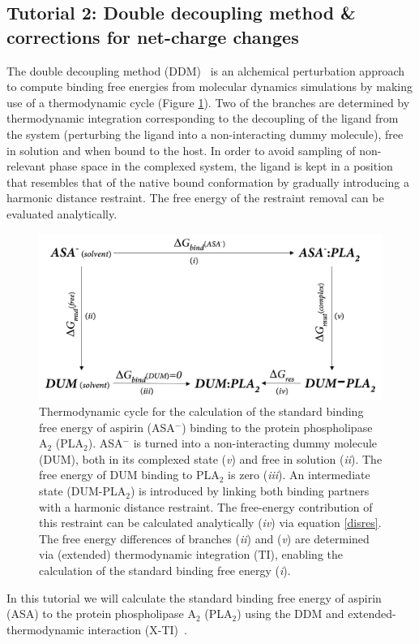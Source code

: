 
\subsection{Tutorial 2: Double decoupling method \& corrections for net-charge changes}
The double decoupling method (DDM)~\cite{DDM} is an alchemical perturbation approach to compute binding free energies from molecular dynamics simulations by making use of a thermodynamic cycle (Figure \ref{TC_ASA}). Two of the branches are determined by thermodynamic integration corresponding to the decoupling of the ligand from the system (perturbing the ligand into a non-interacting dummy molecule), free in solution and when bound to the host. In order to avoid sampling of non-relevant phase space in the complexed system, the ligand is kept in a position that resembles that of the native bound conformation by gradually introducing a harmonic distance restraint. The free energy of the restraint removal can be evaluated analytically.

\begin{figure}[H]
    \centering
    \includegraphics[scale=0.21]{../05_tutorial_02/figures/TC_ASA.png}
    \caption{Thermodynamic cycle for the calculation of the standard binding free energy of aspirin (ASA$^-$) binding to the protein phospholipase A$_2$ (PLA$_2$). ASA$^-$ is turned into a non-interacting dummy molecule (DUM), both in its complexed state (\textit{v}) and free in solution (\textit{ii}). The free energy of DUM binding to PLA$_2$ is zero (\textit{iii}). An intermediate state (DUM-PLA$_2$) is introduced by linking both binding partners with a harmonic distance restraint. The free-energy contribution of this restraint can be calculated analytically (\textit{iv}) via equation \ref{disres}. The free energy differences of branches (\textit{ii}) and (\textit{v}) are determined via (extended) thermodynamic integration (TI), enabling the calculation of the standard binding free energy (\textit{i}).}
    \label{TC_ASA}
\end{figure}
%
In this tutorial we will calculate the standard binding free energy of aspirin (ASA) to the protein phospholipase A$_2$ (PLA$_2$) using the DDM and extended-thermodynamic interaction (X-TI)~\cite{X_TI}. 

